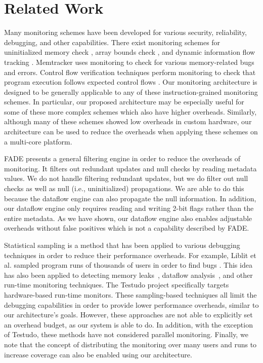 \section{Related Work}
\label{sec:related}

Many monitoring schemes have been developed for various security, reliability,
debugging, and other capabilities. There exist monitoring schemes for uninitialized
memory check \cite{mondrian-asplos02}, array bounds check
\cite{hardbound-asplos08, clause-ase07}, and dynamic information flow
tracking \cite{dift-asplos04, raksha-isca07, loki-osdi08}.
Memtracker \cite{memtracker-hpca07} uses monitoring to check for various
memory-related bugs and errors.  Control flow verification techniques perform
monitoring to check that program execution follows expected control flows
\cite{schuette-comp87, impres-dac06,
kayaalp-isca12}.  Our monitoring architecture is designed to
be generally applicable to any of these instruction-grained monitoring schemes.
In particular, our proposed architecture may be especially useful for some of
these more complex schemes which also have higher overheads.  Similarly,
although many of these schemes showed low overheads in custom hardware, our
architecture can be used to reduce the overheads when applying these schemes on
a multi-core platform.
 
FADE \cite{fade-hpca14} presents a general filtering engine in order to reduce
the overheads of monitoring. It filters out redundant updates and null checks
by reading metadata values. We do not handle filtering redundant updates, but
we do filter out null checks as well as null (i.e., uninitialized)
propagations.  We are able to do this because the dataflow engine can also
propagate the null information.  In addition, our dataflow engine only
requires reading and writing 2-bit flags rather than the entire metadata.  As
we have shown, our dataflow engine also enables adjustable overheads without
false positives which is not a capability described by FADE.

Statistical sampling is a method that has been applied to various debugging
techniques in order to reduce their performance overheads. For example, Liblit
et al. sampled program runs of thousands of users in order to find bugs
\cite{liblit-pldi05}. This idea has also been applied to detecting memory
leaks~\cite{chilimbi-asplos04}, dataflow analysis~\cite{greathouse-cgo11}, and
other run-time monitoring techniques. The Testudo project
\cite{testudo-micro08} specifically targets hardware-based run-time monitors.
These sampling-based techniques all limit the debugging capabilities in order
to provide lower performance overheads, similar to our architecture's goals.
However, these approaches are not able to explicitly set an overhead budget, as
our system is able to do. In addition, with the exception of Testudo, these
methods have not considered parallel monitoring. Finally, we note that the
concept of distributing the monitoring over many users and runs to increase
coverage can also be enabled using our architecture.

